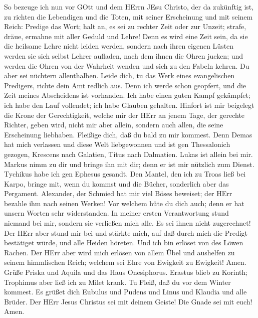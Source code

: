 So bezeuge ich nun vor GOtt und dem HErrn JEsu Christo, der
da zukünftig ist, zu richten die Lebendigen und die Toten, mit seiner
Erscheinung und mit seinem Reich:  Predige das Wort; halt
an, es sei zu rechter Zeit oder zur Unzeit; strafe, dräue, ermahne mit
aller Geduld und Lehre!  Denn es wird eine Zeit sein, da sie
die heilsame Lehre nicht leiden werden, sondern nach ihren eigenen
Lüsten werden sie sich selbst Lehrer aufladen, nach dem ihnen die Ohren
jucken;  und werden die Ohren von der Wahrheit wenden und
sich zu den Fabeln kehren.  Du aber sei nüchtern
allenthalben. Leide dich, tu das Werk eines evangelischen Predigers,
richte dein Amt redlich aus.  Denn ich werde schon geopfert,
und die Zeit meines Abscheidens ist vorhanden.  Ich habe
einen guten Kampf gekämpfet; ich habe den Lauf vollendet; ich habe
Glauben gehalten.  Hinfort ist mir beigelegt die Krone der
Gerechtigkeit, welche mir der HErr an jenem Tage, der gerechte Richter,
geben wird, nicht mir aber allein, sondern auch allen, die seine
Erscheinung liebhaben.  Fleißige dich, daß du bald zu mir
kommest.  Denn Demas hat mich verlassen und diese Welt
liebgewonnen und ist gen Thessalonich gezogen, Krescens nach Galatien,
Titus nach Dalmatien.  Lukas ist allein bei mir. Markus
nimm zu dir und bringe ihn mit dir; denn er ist mir nützlich zum Dienst.
 Tychikus habe ich gen Ephesus gesandt.  Den
Mantel, den ich zu Troas ließ bei Karpo, bringe mit, wenn du kommst und
die Bücher, sonderlich aber das Pergament.  Alexander, der
Schmied hat mir viel Böses beweiset; der HErr bezahle ihm nach seinen
Werken!  Vor welchem hüte du dich auch; denn er hat unsern
Worten sehr widerstanden.  In meiner ersten Verantwortung
stund niemand bei mir, sondern sie verließen mich alle. Es sei ihnen
nicht zugerechnet!  Der HErr aber stund mir bei und stärkte
mich, auf daß durch mich die Predigt bestätiget würde, und alle Heiden
höreten. Und ich bin erlöset von des Löwen Rachen.  Der
HErr aber wird mich erlösen von allem Übel und aushelfen zu seinem
himmlischen Reich; welchem sei Ehre von Ewigkeit zu Ewigkeit! Amen.
 Grüße Priska und Aquila und das Haus Onesiphorus.
 Erastus blieb zu Korinth; Trophimus aber ließ ich zu Milet
krank.  Tu Fleiß, daß du vor dem Winter kommest. Es grüßet
dich Eubulus und Pudens und Linus und Klaudia und alle Brüder.
 Der HErr Jesus Christus sei mit deinem Geiste! Die Gnade
sei mit euch! Amen.
